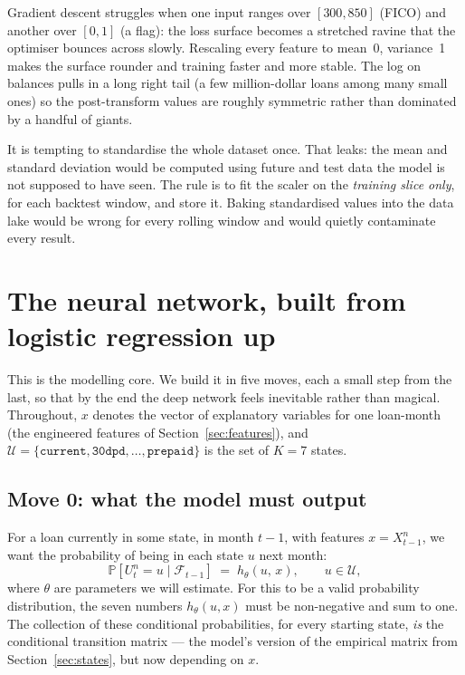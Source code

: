 \documentclass[11pt]{article}
\newcommand{\Prob}{\mathbb{P}}
\newcommand{\state}[1]{\texttt{#1}}
\begin{document}
\begin{intuition}
Gradient descent struggles when one input ranges over $[300,850]$ (FICO) and another over
$[0,1]$ (a flag): the loss surface becomes a stretched ravine that the optimiser bounces
across slowly. Rescaling every feature to mean~0, variance~1 makes the surface rounder and
training faster and more stable. The log on balances pulls in a long right tail (a few
million-dollar loans among many small ones) so the post-transform values are roughly
symmetric rather than dominated by a handful of giants.
\end{intuition}

\begin{intuition}
It is tempting to standardise the whole dataset once. That leaks: the mean and standard
deviation would be computed using future and test data the model is not supposed to have
seen. The rule is to fit the scaler on the \emph{training slice only}, for each backtest
window, and store it. Baking standardised values into the data lake would be wrong for
every rolling window and would quietly contaminate every result.
\end{intuition}

\section{The neural network, built from logistic regression up}
\label{sec:nn}

This is the modelling core. We build it in five moves, each a small step from the last, so
that by the end the deep network feels inevitable rather than magical. Throughout, $x$
denotes the vector of explanatory variables for one loan-month (the engineered features of
Section~\ref{sec:features}), and $\mathcal{U}=\{\state{current},\state{30dpd},\dots,
\state{prepaid}\}$ is the set of $K=7$ states.

\subsection{Move 0: what the model must output}

For a loan currently in some state, in month $t-1$, with features $x = X^n_{t-1}$, we want
the probability of being in each state $u$ next month:
\begin{equation}
  \Prob\!\left[U^n_t = u \mid \mathcal{F}_{t-1}\right] \;=\; h_\theta(u,\, x),
  \qquad u \in \mathcal{U},
  \label{eq:transition}
\end{equation}
where $\theta$ are parameters we will estimate. For this to be a valid probability
distribution, the seven numbers $h_\theta(u,x)$ must be non-negative and sum to one. The
collection of these conditional probabilities, for every starting state, \emph{is} the
conditional transition matrix --- the model's version of the empirical matrix from
Section~\ref{sec:states}, but now depending on $x$.
\end{document}
